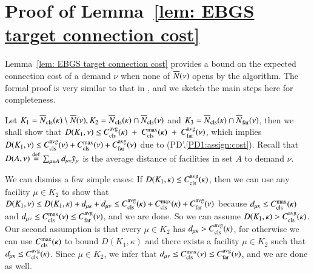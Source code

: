 \documentclass[preprint,12pt]{elsarticle}
\begin{document}


\pagebreak

\appendix
\section{Proof of Lemma~\ref{lem: EBGS target connection cost}}
  Lemma~\ref{lem: EBGS target connection cost} provides a bound on the
  expected connection cost of a demand $\nu$ when none of
  $\wbarN(\nu)$ opens by the algorithm. The formal proof is very
  similar to that in \cite{ByrkaA10}, and we sketch the main steps
  here for completeness.

  Let $K_1 = \wbarclsnb(\kappa) \setminus \wbarN(\nu), K_2 =
  \wbarclsnb(\kappa) \cap \wbarclsnb(\nu)$ and $K_3 =
  \wbarclsnb(\kappa) \cap \wbarfarnb(\nu)$, then we shall show that
  $D(K_1, \nu) \leq \clsdist(\kappa)\;+\;\clsmax(\kappa)\; + \;
  \fardist(\nu)$, which implies $D(K_1, \nu) \leq \clsdist(\nu) +
  \clsmax(\nu) + \fardist(\nu)$ due to
  (PD'.\ref{PD1:assign:cost}). Recall that $D(A,\nu)
  \stackrel{\mathrm{def}}{=} \sum_{\mu\in A} d_{\mu\nu}\bary_{\mu}$ is
  the average distance of facilities in set $A$ to demand $\nu$.

  We can dismiss a few simple cases: If $D(K_1, \kappa) \leq
  \clsdist(\kappa)$, then we can use any facility $\mu \in K_2$ to
  show that $D(K_1,\nu) \leq D(K_1, \kappa) + d_{\mu\kappa} +
  d_{\mu\nu} \leq \clsdist(\kappa) + \clsmax(\kappa) + \fardist(\nu)$
  because $d_{\mu\kappa} \leq \clsmax(\kappa)$ and $d_{\mu\nu} \leq
  \clsmax(\nu) \leq \fardist(\nu)$, and we are done. So we can assume
  $D(K_1, \kappa) > \clsdist(\kappa)$. Our second assumption is that
  every $\mu \in K_2$ has $d_{\mu\kappa} > \clsdist(\kappa)$, for
  otherwise we can use $\clsmax(\kappa)$ to bound $D(K_1, \kappa)$ and
  there exists a facility $\mu\in K_2$ such that $d_{\mu\kappa} \leq
  \clsdist(\kappa)$. Since $\mu\in K_2$, we infer that $d_{\mu\nu}
  \leq \clsmax(\nu) \leq \fardist(\nu)$, and we are done as well.
\end{document}
